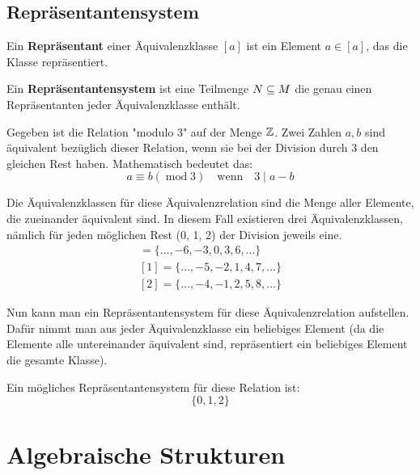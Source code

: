 \documentclass[11pt]{article}
\begin{document}
\subsection{Repräsentantensystem}
Ein \textbf{Repräsentant} einer Äquivalenzklasse $[a]$ ist ein Element $a \in [a]$, das die Klasse repräsentiert.

Ein \textbf{Repräsentantensystem} ist eine Teilmenge $N \subseteq M$ die genau einen Repräsentanten jeder Äquivalenzklasse
enthält.

\begin{bsp}
  Gegeben ist die Relation "modulo 3" auf der Menge $\mathbb{Z}$. Zwei Zahlen $a, b$ sind äquivalent bezüglich dieser Relation,
  wenn sie bei der Division durch 3 den gleichen Rest haben. Mathematisch bedeutet das:
  \[
    a \equiv b(\operatorname{mod} 3) \quad \text{wenn}\quad 3\mid a-b
  \]

  Die Äquivalenzklassen für diese Äquivalenzrelation sind die Menge aller Elemente, die zueinander äquivalent sind.
  In diesem Fall existieren drei Äquivalenzklassen, nämlich für jeden möglichen Rest (0, 1, 2) der Division jeweils eine.
  \begin{align*}
    [0] = \{\ldots, -6, -3, 0, 3, 6, \ldots\} \\
    [1] = \{\ldots, -5, -2, 1, 4, 7, \ldots\} \\
    [2] = \{\ldots, -4, -1, 2, 5, 8, \ldots\}
  \end{align*}

  Nun kann man ein Repräsentantensystem für diese Äquivalenzrelation aufstellen. Dafür nimmt man aus jeder Äquivalenzklasse
  ein beliebiges Element (da die Elemente alle untereinander äquivalent sind, repräsentiert ein beliebiges Element die
  gesamte Klasse).

  Ein mögliches Repräsentantensystem für diese Relation ist:
  \[
    \{0, 1, 2\}
  \]
\end{bsp}

\section{Algebraische Strukturen}
\end{document}
